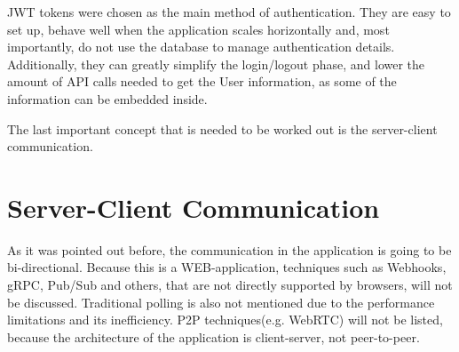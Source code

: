 JWT tokens were chosen as the main method of authentication. They are easy to set up, behave well when the
application scales horizontally and, most importantly, do not use the database to manage authentication details.
Additionally, they can greatly simplify the login/logout phase, and lower the amount of API calls needed to get the
User information, as some of the information can be embedded inside.

The last important concept that is needed to be worked out is the server-client communication.


\section{Server-Client Communication}
As it was pointed out before, the communication in the application is going to be bi-directional.
Because this is a WEB-application, techniques such as Webhooks, gRPC, Pub/Sub and
others, that are not directly supported by browsers, will not be discussed. Traditional polling is also not mentioned due
to the performance limitations and its inefficiency. P2P techniques(e.g. WebRTC) will not be listed,
because the architecture of the application is client-server, not peer-to-peer.


